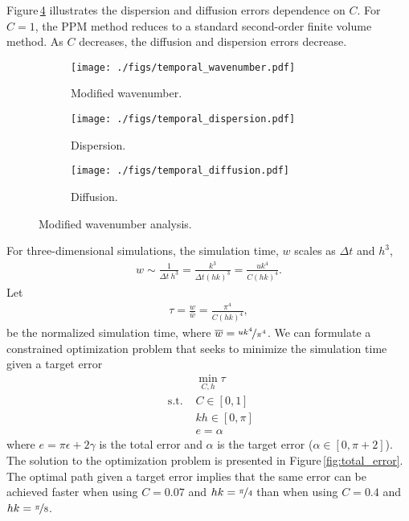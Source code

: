 \documentclass[review]{elsarticle}
\begin{document}
Figure\,\ref{fig:temporal_analysis} illustrates the dispersion and
diffusion errors dependence on $C$. For $C=1$, the PPM method reduces
to a standard second-order finite volume method. As $C$ decreases, the
diffusion and dispersion errors decrease.

\begin{figure}[!tbp]%
  \centering%
  \begin{subfigure}[t]{0.32\textwidth}%
    \texttt{[image: ./figs/temporal\_wavenumber.pdf]}%
    \caption{Modified wavenumber.}\label{fig:dispersion}%
  \end{subfigure}%
  \hfill%
  \begin{subfigure}[t]{0.32\textwidth}%
    \texttt{[image: ./figs/temporal\_dispersion.pdf]}%
    \caption{Dispersion.}\label{fig:dispersion}%
  \end{subfigure}%
  \hfill%
  \begin{subfigure}[t]{0.32\textwidth}%
    \texttt{[image: ./figs/temporal\_diffusion.pdf]}%
    \caption{Diffusion.}\label{fig:diffusion}%
  \end{subfigure}%
  \caption{Modified wavenumber analysis.}\label{fig:temporal_analysis}%
\end{figure}%

For three-dimensional simulations, the simulation time, $w$ scales as
$\Delta t$ and $h^3$,
\begin{align*}
  w \sim \frac{1}{\Delta t~h^3} = \frac{k^3}{\Delta t (hk)^3} = \frac{u k^4}{C (hk)^4}.
\end{align*}
Let 
\begin{align*}
 \tau = \frac{w}{\overline{w}} = \frac{\pi^4}{C(hk)^4},
\end{align*}
be the normalized simulation time, where
$\overline{w}=\nicefrac{u k^4}{\pi^4}$. We can formulate a constrained
optimization problem that seeks to minimize the simulation time given
a target error
\begin{align*}
  &\min_{C,h} \tau\\
  \text{ s.t. }& C \in [0,1]\\
  & kh \in [0,\pi]\\
  & e = \alpha
\end{align*}
where $e = \pi\epsilon + 2 \gamma$ is the total error and $\alpha$ is
the target error ($\alpha \in [0, \pi+2]$). The solution to the
optimization problem is presented in
Figure\,\ref{fig:total_error}. The optimal path given a target error
implies that the same error can be achieved faster when using $C=0.07$
and $hk=\nicefrac{\pi}{4}$ than when using $C=0.4$ and
$hk=\nicefrac{\pi}{8}$.
\end{document}
